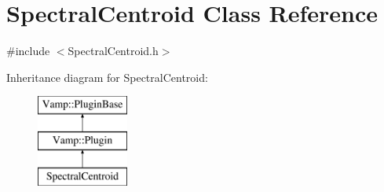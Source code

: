 \hypertarget{class_spectral_centroid}{}\section{Spectral\+Centroid Class Reference}
\label{class_spectral_centroid}


{\ttfamily \#include $<$Spectral\+Centroid.\+h$>$}

Inheritance diagram for Spectral\+Centroid\+:\begin{figure}[H]
\begin{center}
\leavevmode
\includegraphics[height=3.000000cm]{class_spectral_centroid}
\end{center}
\end{figure}
